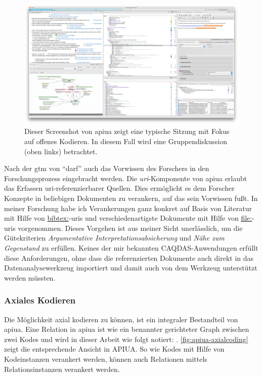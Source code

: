 \begin{figure}
  \centering
    \includegraphics[width=1.0\linewidth]{Figures/apiua/opencoding-gd.png}
  \caption[APIUA: Gruppendiskussion]{Dieser Screenshot von \gls{apiua} zeigt eine typische Sitzung mit Fokus auf offenes Kodieren. In diesem Fall wird eine Gruppendiskussion (oben links) betrachtet.}
  \label{fig:apiua-opencoding-gd}
\end{figure}

Nach der \gls{gtm} von \cite{strauss1990basics,corbin2014basics} ``darf'' auch das Vorwissen des Forschers in den Forschungsprozess eingebracht werden. Die \textit{\acrshort{uri}}-Komponente von \acrshort{apiua} erlaubt das Erfassen \acrshort{uri}-referenzierbarer Quellen. Dies ermöglicht es dem Forscher Konzepte in beliebigen Dokumenten zu verankern, auf das sein Vorwissen fußt. In meiner Forschung habe ich Verankerungen ganz konkret auf Basis von Literatur mit Hilfe von \url{bibtex:}-\acrshort{uri}s und verschiedenartigste Dokumente mit Hilfe von \url{file:}-\acrshort{uri}s vorgenommen. Dieses Vorgehen ist aus meiner Sicht unerlässlich, um die Gütekriterien \textit{Argumentative Interpretationsabsicherung} und \textit{Nähe zum Gegenstand} zu erfüllen. Keines der mir bekannten CAQDAS-Anwendungen erfüllt diese Anforderungen, ohne dass die referenzierten Dokumente auch direkt in das Datenanalysewerkzeug importiert und damit auch von dem Werkzeug unterstützt werden müssten.




\subsubsection{Axiales Kodieren}
\label{sec:apiua-axial-coding}

Die Möglichkeit axial kodieren zu können, ist ein integraler Bestandteil von \gls{apiua}. Eine Relation in \gls{apiua} ist wie ein benannter gerichteter Graph zwischen zwei Kodes und wird in dieser Arbeit wie folgt notiert: . \autoref{fig:apiua-axialcoding} zeigt die entsprechende Ansicht in APIUA. So wie Kodes mit Hilfe von Kodeinstanzen verankert werden, können auch Relationen mittels Relationsinstanzen verankert werden.


